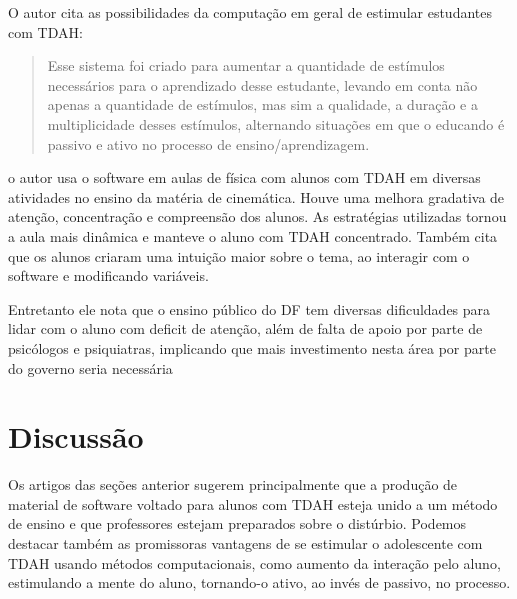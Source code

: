 O autor cita as possibilidades da computação em geral de estimular estudantes com TDAH:

\begin{quote}
Esse sistema foi criado para aumentar a quantidade de estímulos necessários para o aprendizado desse estudante, levando em conta não apenas a quantidade de estímulos, mas sim a qualidade, a duração e a multiplicidade desses estímulos, alternando situações em que o educando é passivo e ativo no processo de ensino/aprendizagem. \cite{gomides}
\end{quote}

o autor usa o software em aulas de física com alunos com TDAH em diversas atividades no ensino da matéria de cinemática. Houve uma melhora gradativa de atenção, concentração e compreensão dos alunos. As estratégias utilizadas tornou a aula mais dinâmica e manteve o aluno com TDAH concentrado. Também cita que os alunos criaram uma intuição maior sobre o tema, ao interagir com o software e modificando variáveis.

Entretanto ele nota que o ensino público do DF tem diversas dificuldades para lidar com o aluno com deficit de atenção, além de falta de apoio por parte de psicólogos e psiquiatras, implicando que mais investimento nesta área por parte do governo seria necessária


\section{Discussão}

Os artigos das seções anterior sugerem principalmente que a produção de material de software voltado para alunos com TDAH esteja unido a um método de ensino e que professores estejam preparados sobre o distúrbio. Podemos destacar também as promissoras vantagens de se estimular o adolescente com TDAH usando métodos computacionais, como aumento da interação pelo aluno, estimulando a mente do aluno, tornando-o ativo, ao invés de passivo, no processo.

